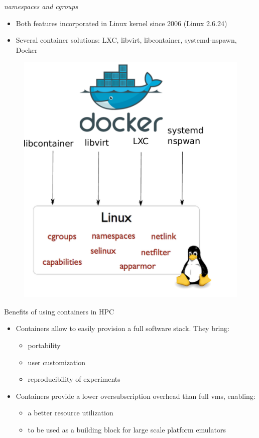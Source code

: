 \documentclass[11pt,xcolor=dvipsnames,presentation]{beamer}
\begin{document}
\begin{frame}[label=sec-3-0-3]{\emph{namespaces and cgroups}}
\begin{itemize}
\item Both features incorporated in Linux kernel since 2006 (Linux 2.6.24)
\item Several container solutions: LXC, libvirt, libcontainer, systemd-nspawn, Docker
\end{itemize}

\begin{figure}[!h]
  \center
\includegraphics[scale=0.30]{figures/libcontainer-diagram.pdf}
  \label{fig:hpc}
\end{figure}
\end{frame}

\begin{frame}[label=sec-3-0-4]{Benefits of using containers in HPC}
\begin{itemize}
\item Containers allow to easily provision a full software stack.
They bring:
\begin{itemize}
\item portability
\item user customization
\item reproducibility of experiments
\end{itemize}

\item Containers provide a lower oversubscription overhead than full vms, enabling:
\begin{itemize}
\item a better resource utilization
\item to be used as a building block for large scale platform emulators
\end{itemize}
\end{itemize}
\end{frame}
\end{document}
